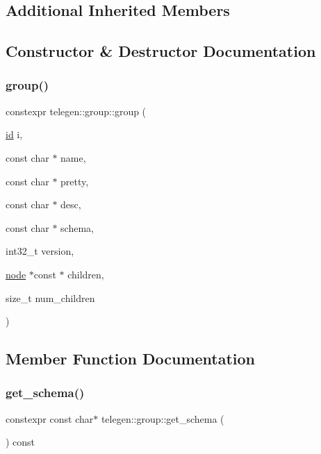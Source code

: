 \subsection*{Additional Inherited Members}


\subsection{Constructor \& Destructor Documentation}
\mbox{\label{classtelegen_1_1group_aed66803b4b989a001bdafcd501d074ba}} 
\subsubsection{\texorpdfstring{group()}{group()}}
{\footnotesize\ttfamily constexpr telegen\+::group\+::group (\begin{DoxyParamCaption}\item[{\hyperlink{classtelegen_1_1node_aae3ff0d12932c55fdc88a1743e27ea56}{id}}]{i,  }\item[{const char $\ast$}]{name,  }\item[{const char $\ast$}]{pretty,  }\item[{const char $\ast$}]{desc,  }\item[{const char $\ast$}]{schema,  }\item[{int32\+\_\+t}]{version,  }\item[{\hyperlink{classtelegen_1_1node}{node} $\ast$const $\ast$}]{children,  }\item[{size\+\_\+t}]{num\+\_\+children }\end{DoxyParamCaption})\hspace{0.3cm}{\ttfamily [inline]}}



\subsection{Member Function Documentation}
\mbox{\label{classtelegen_1_1group_ad5e61c5d1787e20921691b0ec2351396}} 
\subsubsection{\texorpdfstring{get\+\_\+schema()}{get\_schema()}}
{\footnotesize\ttfamily constexpr const char$\ast$ telegen\+::group\+::get\+\_\+schema (\begin{DoxyParamCaption}{ }\end{DoxyParamCaption}) const\hspace{0.3cm}{\ttfamily [inline]}}

